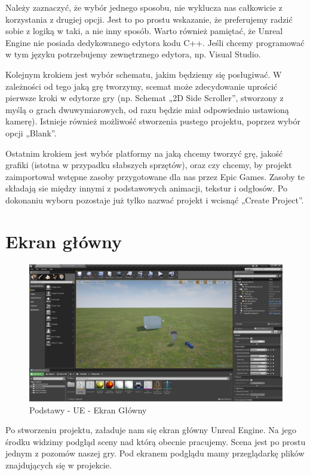 \documentclass[openright]{xmgr}
\begin{document}
Należy zaznaczyć, że wybór jednego sposobu, nie wyklucza nas całkowicie z korzystania z drugiej opcji. Jest to po prostu wskazanie, że preferujemy radzić sobie z logiką w taki, a nie inny sposób.
Warto również pamiętać, że Unreal Engine nie posiada dedykowanego edytora kodu C++. Jeśli chcemy programować w tym języku potrzebujemy zewnętrznego edytora, np. Visual Studio.

Kolejnym krokiem jest wybór schematu, jakim będziemy się posługiwać. W zależności od tego jaką grę tworzymy, scemat może zdecydowanie uprościć pierwsze kroki w edytorze gry (np. Schemat „2D Side Scroller”, stworzony z myślą o grach dwuwymiarowych, od razu będzie miał odpowiednio ustawioną kamerę). Istnieje również możliwość stworzenia pustego projektu, poprzez wybór opcji „Blank”.

Ostatnim krokiem jest wybór platformy na jaką chcemy tworzyć grę, jakość grafiki (istotna w przypadku słabszych sprzętów), oraz czy chcemy, by projekt zaimportował wstępne zasoby przygotowane dla nas przez Epic Games. Zasoby te składają sie między innymi z podstawowych animacji, tekstur i odgłosów.
Po dokonaniu wyboru pozostaje już tylko nazwać projekt i wcisnąć „Create Project”.

\newpage
\section{Ekran główny}

\begin{figure}[!htb]
    \begin{center}
    \includegraphics[scale=0.25]{Screeny/Main}
    \end{center}
    \caption{Podstawy - UE - Ekran Główny}
\end{figure}

Po stworzeniu projektu, załaduje nam się ekran główny Unreal Engine. Na jego środku widzimy podgląd sceny nad którą obecnie pracujemy. Scena jest po prostu jednym z pozomów naszej gry.
Pod ekranem podglądu mamy przeglądarkę plików znajdujących się w projekcie.
\end{document}
